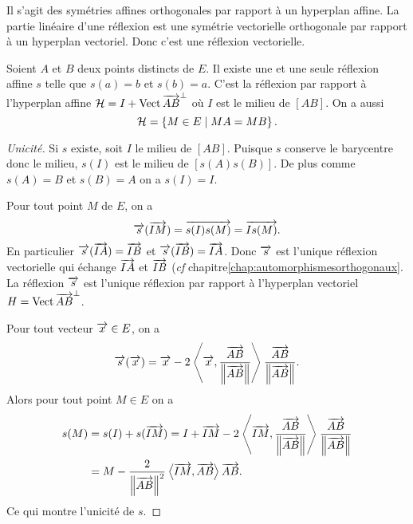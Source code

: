 Il s'agit des symétries affines orthogonales par rapport à un hyperplan affine.
La partie linéaire d'une réflexion est une symétrie vectorielle orthogonale par
rapport à un hyperplan vectoriel. Donc c'est une réflexion vectorielle.

\begin{prop}
  Soient \(A\) et \(B\) deux points distincts de \(E\). Il existe une et une
  seule réflexion affine \(s\) telle que \(s(a)=b\) et \(s(b)=a\). C'est la
  réflexion par rapport à l'hyperplan affine \(\mathcal{H}=I
  +\operatorname{Vect}{\overrightarrow{AB}}^\perp\) où \(I\) est le milieu de \([AB]\). On a
  aussi
  \begin{equation}
    \mathcal{H} = \left\{M \in E\mathrel{}\middle|\mathrel{}MA=MB\right\}.
  \end{equation}
\end{prop}
\begin{proof}[Unicité]
  Si \(s\) existe, soit \(I\) le milieu de \([AB]\). Puisque \(s\) conserve le
  barycentre donc le milieu, \(s(I)\) est le milieu de \([s(A)s(B)]\). De plus
  comme \(s(A)=B\) et \(s(B)=A\) on a \(s(I)=I\).

  Pour tout point \(M\) de \(E\), on a
  \begin{equation}
    \overrightarrow{s}(\overrightarrow{IM}) = \overrightarrow{s(I)s(M)} = \overrightarrow{Is(M)}.
  \end{equation}
  En particulier \(\overrightarrow{s}(\overrightarrow{IA})=\overrightarrow{IB}\) et
  \(\overrightarrow{s}(\overrightarrow{IB})=\overrightarrow{IA}\). Donc \(\overrightarrow{s}\) est l'unique réflexion
  vectorielle qui échange \(\overrightarrow{IA}\) et \(\overrightarrow{IB}\) (\emph{cf} chapitre\ref{chap:automorphismesorthogonaux}. La réflexion \(\overrightarrow{s}\) est l'unique
  réflexion par rapport à l'hyperplan vectoriel \(H =
  \operatorname{Vect}{\overrightarrow{AB}}^\perp\).

  Pour tout vecteur \(\overrightarrow{x} \in E\), on a
  \begin{equation}
    \overrightarrow{s}(\overrightarrow{x}) = \overrightarrow{x} - 2\left\langle{\overrightarrow{x}},{\frac{\overrightarrow{AB}}{\left\lVert\overrightarrow{AB}\right\rVert}}\right\rangle
    \frac{\overrightarrow{AB}}{\left\lVert\overrightarrow{AB}\right\rVert}.
  \end{equation}
  Alors pour tout point \(M \in E\) on a
  \begin{align*}
    s(M) &= s(I) + s(\overrightarrow{IM}) = I + \overrightarrow{IM}
    -2\left\langle{\overrightarrow{IM}},{\frac{\overrightarrow{AB}}{\left\lVert\overrightarrow{AB}\right\rVert}}\right\rangle
    \frac{\overrightarrow{AB}}{\left\lVert\overrightarrow{AB}\right\rVert} \\
    &=M -\frac{2}{\left\lVert\overrightarrow{AB}\right\rVert^2}\left\langle{\overrightarrow{IM}},{\overrightarrow{AB}}\right\rangle \overrightarrow{AB}.
  \end{align*}
  Ce qui montre l'unicité de \(s\).
\end{proof}
